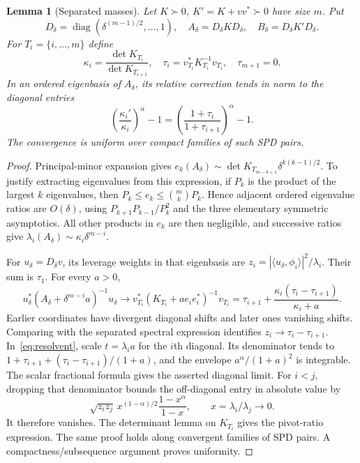 \documentclass[11pt]{article}
\newtheorem{lemma}[theorem]{Lemma}
\newcommand{\diag}{\operatorname{diag}}
\begin{document}
\begin{lemma}[Separated masses]\label{lem:masses}
Let $K\succ0$, $K'=K+vv^*\succ0$ have size $m$. Put
\[
 D_\delta=\diag(\delta^{(m-1)/2},\ldots,1),\quad
 A_\delta=D_\delta K D_\delta,\quad B_\delta=D_\delta K'D_\delta.
\]
For $T_i=\{i,\ldots,m\}$ define
\[
 \kappa_i=\frac{\det K_{T_i}}{\det K_{T_{i+1}}},\quad
 \tau_i=v_{T_i}^*K_{T_i}^{-1}v_{T_i},\quad\tau_{m+1}=0.
\]
In an ordered eigenbasis of $A_\delta$, its relative correction tends
in norm to the diagonal entries
\[
 \left(\frac{\kappa_i'}{\kappa_i}\right)^\alpha-1
          =\left(\frac{1+\tau_i}{1+\tau_{i+1}}\right)^\alpha-1.
\]
The convergence is uniform over compact families of such SPD pairs.
\end{lemma}
\begin{proof}
Principal-minor expansion gives
$e_k(A_\delta)\sim\det K_{T_{m-k+1}}\delta^{k(k-1)/2}$.
To justify extracting eigenvalues from this expression, if $P_k$ is
the product of the largest $k$ eigenvalues, then
$P_k\le e_k\le\binom mkP_k$. Hence adjacent ordered eigenvalue
ratios are $O(\delta)$, using
$P_{k+1}P_{k-1}/P_k^2$ and the three elementary symmetric asymptotics.
All other products in $e_k$ are then negligible, and successive ratios
give $\lambda_i(A_\delta)\sim\kappa_i\delta^{m-i}$.

For $u_\delta=D_\delta v$, its leverage weights in that eigenbasis
are $z_i=|\langle u_\delta,\phi_i\rangle|^2/\lambda_i$.
Their sum is $\tau_1$. For every $a>0$,
\[
 u_\delta^*(A_\delta+\delta^{m-i}a)^{-1}u_\delta
   \longrightarrow v_{T_i}^*(K_{T_i}+ae_ie_i^*)^{-1}v_{T_i}
   =\tau_{i+1}+\frac{\kappa_i(\tau_i-\tau_{i+1})}{\kappa_i+a}.
\]
Earlier coordinates have divergent diagonal shifts and later ones
vanishing shifts. Comparing with the separated spectral expression
identifies $z_i\to\tau_i-\tau_{i+1}$.
In~\eqref{eq:resolvent}, scale $t=\lambda_i a$ for the $i$th diagonal.
Its denominator tends to
$1+\tau_{i+1}+(\tau_i-\tau_{i+1})/(1+a)$, and the envelope
$a^\alpha/(1+a)^2$ is integrable. The scalar fractional formula gives
the asserted diagonal limit. For $i<j$, dropping that denominator
bounds the off-diagonal entry in absolute value by
\[
 \sqrt{z_i z_j}\,x^{(1-\alpha)/2}\frac{1-x^\alpha}{1-x},
                     \qquad x=\lambda_i/\lambda_j\to0.
\]
It therefore vanishes. The determinant lemma on $K_{T_i}$ gives the
pivot-ratio expression. The same proof holds along convergent families
of SPD pairs. A compactness/subsequence argument proves uniformity.
\end{proof}
\end{document}
